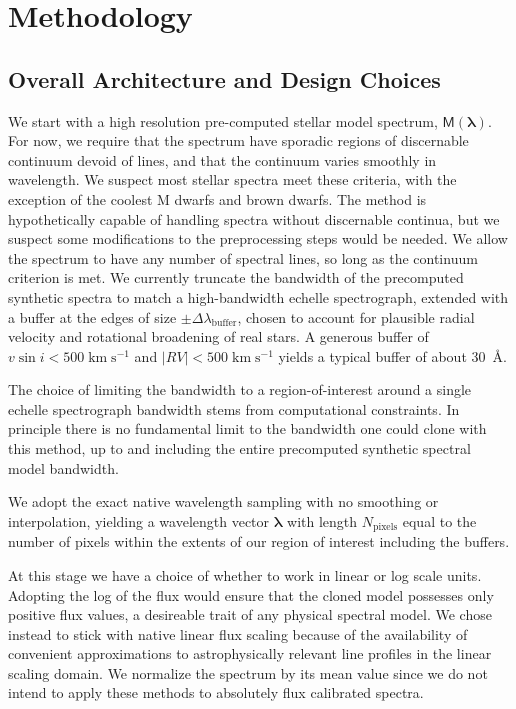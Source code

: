 \documentclass[modern]{aastex631}
\def\kmps{\mathrm{km}\;\mathrm{s}^{-1}}
\begin{document}
\section{Methodology}

\subsection{Overall Architecture and Design Choices}

We start with a high resolution pre-computed stellar model spectrum, $\mathsf{M}(\bm{\lambda})$.  For now, we require that the spectrum have sporadic regions of discernable continuum devoid of lines, and that the continuum varies smoothly in wavelength.  We suspect most stellar spectra meet these criteria, with the exception of the coolest M dwarfs and brown dwarfs.  The method is hypothetically capable of handling spectra without discernable continua, but we suspect some modifications to the preprocessing steps would be needed.  We allow the spectrum to have any number of spectral lines, so long as the continuum criterion is met.  We currently truncate the bandwidth of the precomputed synthetic spectra to match a high-bandwidth echelle spectrograph, extended with a buffer at the edges of size $\pm \Delta \lambda_{\mathrm{buffer}}$, chosen to account for plausible radial velocity and rotational broadening of real stars.  A generous buffer of $v \sin{i} < 500 \;\kmps$ and $|RV|<500 \;\kmps$ yields a typical buffer of about 30~\AA.

The choice of limiting the bandwidth to a region-of-interest around a single echelle spectrograph bandwidth stems from computational constraints.  In principle there is no fundamental limit to the bandwidth one could clone with this method, up to and including the entire precomputed synthetic spectral model bandwidth.

We adopt the exact native wavelength sampling with no smoothing or interpolation, yielding a wavelength vector $\bm{\lambda}$ with length $N_\mathrm{pixels}$ equal to the number of pixels within the extents of our region of interest including the buffers.

At this stage we have a choice of whether to work in linear or log scale units.  Adopting the log of the flux would ensure that the cloned model possesses only positive flux values, a desireable trait of any physical spectral model.  We chose instead to stick with native linear flux scaling because of the availability of convenient approximations to astrophysically relevant line profiles in the linear scaling domain.  We normalize the spectrum by its mean value since we do not intend to apply these methods to absolutely flux calibrated spectra.
\end{document}

